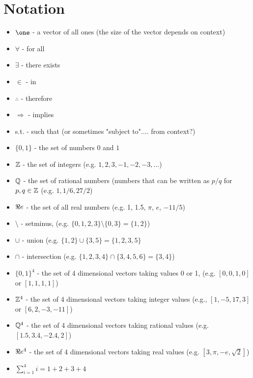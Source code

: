 
%
%
%

\section*{Notation}
\begin{itemize}
\item $\one$ - a vector of all ones (the size of the vector depends on context)
\item $\forall$ - for all
\item $\exists$ - there exists
\item $\in$ - in
\item $\therefore$ - therefore
\item $\Rightarrow$ - implies
\item s.t.  - such that (or sometimes "subject to".... from context?)
\item $\{0,1\}$ - the set of numbers $0$ and $1$
\item ${\mathbb{Z}}$ - the set of integers (e.g. $1,2,3,-1,-2,-3,...$)
\item ${\mathbb{Q}}$ - the set of rational numbers (numbers that can be written as $p/q$ for $p,q \in {\mathbb{Z}}$ (e.g. $1, 1/6, 27/2$)
\item $\Re e$  - the set of all real numbers (e.g. 1, 1.5, $\pi$, $e$, $-11/5$)
\item $\setminus$ - setminus, (e.g.  $\{0,1,2,3\} \setminus \{0,3\} = \{1,2\}$)
\item $\cup$ - union (e.g.  $\{1,2\} \cup \{3,5\} = \{1,2,3,5\}$
\item $\cap$ - intersection (e.g. $\{1,2,3,4\} \cap \{3,4,5,6\} = \{3,4\}$)
\item $\{0,1\}^4$ - the set of 4 dimensional vectors taking values 0 or 1, (e.g. $[0,0,1,0]$ or $[1,1,1,1]$)
\item ${\mathbb{Z}}^4$ - the set of 4 dimensional vectors taking integer values (e.g., $[1,-5,17,3]$ or $[6 , 2, -3, -11]$)
\item ${\mathbb{Q}}^4$ - the set of 4 dimensional vectors taking rational values (e.g. $[1.5, 3.4, -2.4, 2]$)
\item $\Re e^4$ - the set of 4 dimensional vectors taking real values (e.g. $[3, \pi, -e, \sqrt{2}]$)
\item $\sum_{i=1}^4 i  = 1 + 2 + 3 + 4$

\end{itemize}
